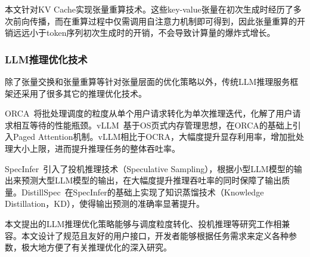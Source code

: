 本文针对KV Cache实现张量重算技术。这些key-value张量在初次生成时经历了多次前向传播，而在重算过程中仅需调用自注意力机制即可得到，因此张量重算的开销远远小于token序列初次生成时的开销，不会导致计算量的爆炸式增长。

\subsubsection{LLM推理优化技术}

除了张量交换和张量重算等针对张量层面的优化策略以外，传统LLM推理服务框架还采用了很多其它的推理优化技术。

ORCA~\cite{ORCA}将批处理调度的粒度从单个用户请求转化为单次推理迭代，化解了用户请求相互等待的性能瓶颈。vLLM~\cite{vLLM}基于OS页式内存管理思想，在ORCA的基础上引入Paged Attention机制。vLLM相比于OCRA，大幅度提升显存利用率，增加批处理大小上限，进而提升推理任务的整体吞吐率。

SpecInfer~\cite{SpecInfer}引入了投机推理技术（Speculative Sampling），根据小型LLM模型的输出来预测大型LLM模型的输出，在大幅度提升推理吞吐率的同时保障了输出质量。DistillSpec~\cite{DistillSpec}在SpecInfer的基础上实现了知识蒸馏技术（Knowledge Distillation，KD），使得输出预测的准确率显著提升。

本文提出的LLM推理优化策略能够与调度粒度转化、投机推理等研究工作相兼容。本文设计了规范且友好的用户接口，开发者能够根据任务需求来定义各种参数，极大地方便了有关推理优化的深入研究。
